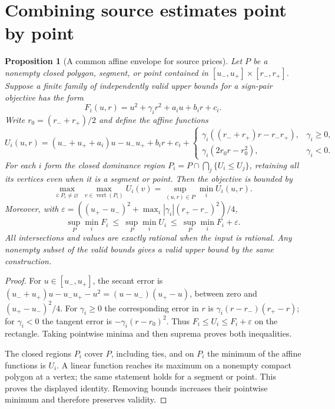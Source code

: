 \documentclass[11pt]{article}
\newtheorem{proposition}[theorem]{Proposition}
\begin{document}
\section{Combining source estimates point by point}
\begin{proposition}[A common affine envelope for source prices]
\label{prop:new-hybrid-affine-source-envelope}
Let $P$ be a nonempty closed polygon, segment, or point contained in
$[u_-,u_+]\times[r_-,r_+]$.  Suppose a finite family of independently
valid upper bounds for a sign-pair objective has the form
\[
 F_i(u,r)=u^2+\gamma_i r^2+a_i u+b_i r+c_i.
\]
Write $r_0=(r_-+r_+)/2$ and define the affine functions
\[
 U_i(u,r)=(u_-+u_++a_i)u-u_-u_++b_i r+c_i+
 \begin{cases}
  \gamma_i((r_-+r_+)r-r_-r_+),&\gamma_i\geq0,\\
  \gamma_i(2r_0r-r_0^2),&\gamma_i<0.
 \end{cases}
\]
For each $i$ form the closed dominance region
$P_i=P\cap\bigcap_j\{U_i\leq U_j\}$, retaining all its vertices even
when it is a segment or point.  Then the objective is bounded by
\[
 \max_{i:P_i\ne\varnothing}\ \max_{v\in\operatorname{vert}(P_i)}U_i(v)
       =\sup_{(u,r)\in P}\min_i U_i(u,r).
\]
Moreover, with
$\varepsilon=((u_+-u_-)^2+\max_i|\gamma_i|(r_+-r_-)^2)/4$,
\[
 \sup_P\min_iF_i\ \leq\ \sup_P\min_iU_i
                          \ \leq\ \sup_P\min_iF_i+\varepsilon.
\]
All intersections and values are exactly rational when the input is
rational.  Any nonempty subset of the valid bounds gives a valid
upper bound by the same construction.
\end{proposition}
\begin{proof}
For $u\in[u_-,u_+]$, the secant error is
$(u_-+u_+)u-u_-u_+-u^2=(u-u_-)(u_+-u)$, between zero and
$(u_+-u_-)^2/4$.  For $\gamma_i\geq0$ the corresponding error in
$r$ is $\gamma_i(r-r_-)(r_+-r)$; for $\gamma_i<0$ the tangent error
is $-\gamma_i(r-r_0)^2$.  Thus $F_i\leq U_i\leq F_i+\varepsilon$
on the rectangle.  Taking pointwise minima and then suprema proves
both inequalities.

The closed regions $P_i$ cover $P$, including ties, and on $P_i$ the
minimum of the affine functions is $U_i$.  A linear function reaches
its maximum on a nonempty compact polygon at a vertex; the same
statement holds for a segment or point.  This proves the displayed
identity.  Removing bounds increases their pointwise minimum and
therefore preserves validity.
\end{proof}
\end{document}
